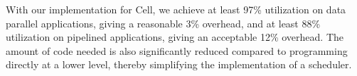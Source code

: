 With our implementation for Cell, we achieve at least 97\% utilization
on data parallel applications, giving a reasonable 3\% overhead,
 and at least 88\% utilization on pipelined applications,
giving an acceptable 12\% overhead. The amount of code
needed is also significantly reduced compared to programming directly
at a lower level, thereby simplifying the implementation of a
scheduler.

